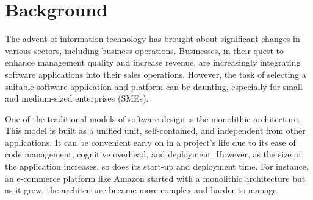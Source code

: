 \section{Background}
The advent of information technology has brought about significant changes in various sectors, including business operations. Businesses, in their quest to enhance management quality and increase revenue, are increasingly integrating software applications into their sales operations. However, the task of selecting a suitable software application and platform can be daunting, especially for small and medium-sized enterprises (SMEs).

One of the traditional models of software design is the monolithic architecture. This model is built as a unified unit, self-contained, and independent from other applications. It can be convenient early on in a project’s life due to its ease of code management, cognitive overhead, and deployment. However, as the size of the application increases, so does its start-up and deployment time. For instance, an e-commerce platform like Amazon started with a monolithic architecture but as it grew, the architecture became more complex and harder to manage.

